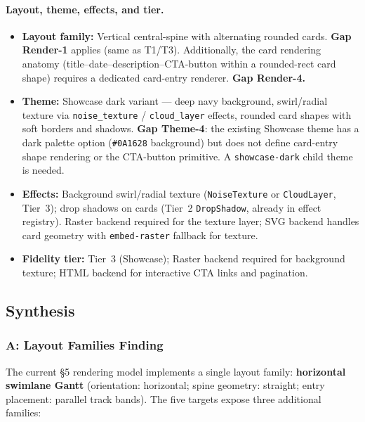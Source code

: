 \paragraph{Layout, theme, effects, and tier.}
\begin{itemize}
  \item \textbf{Layout family:} Vertical central-spine with alternating rounded cards.
        \textbf{Gap Render-1} applies (same as T1/T3). Additionally, the card rendering
        anatomy (title--date--description--CTA-button within a rounded-rect card shape)
        requires a dedicated card-entry renderer. \textbf{Gap Render-4.}
  \item \textbf{Theme:} Showcase dark variant --- deep navy background, swirl/radial
        texture via \texttt{noise\_texture} / \texttt{cloud\_layer} effects, rounded
        card shapes with soft borders and shadows.
        \textbf{Gap Theme-4}: the existing Showcase theme has a dark palette option
        (\texttt{\#0A1628} background) but does not define card-entry shape rendering
        or the CTA-button primitive. A \texttt{showcase-dark} child theme is needed.
  \item \textbf{Effects:} Background swirl/radial texture (\texttt{NoiseTexture} or
        \texttt{CloudLayer}, Tier~3); drop shadows on cards (Tier~2 \texttt{DropShadow},
        already in effect registry). Raster backend required for the texture layer;
        SVG backend handles card geometry with \texttt{embed-raster} fallback for texture.
  \item \textbf{Fidelity tier:} Tier~3 (Showcase); Raster backend required for
        background texture; HTML backend for interactive CTA links and pagination.
\end{itemize}


\subsection{Synthesis}
\label{sec:target-synthesis}

\subsubsection{A: Layout Families Finding}
\label{sec:target-layout-families}

The current \S5 rendering model implements a single layout family: \textbf{horizontal
swimlane Gantt} (orientation: horizontal; spine geometry: straight; entry placement:
parallel track bands). The five targets expose three additional families:

